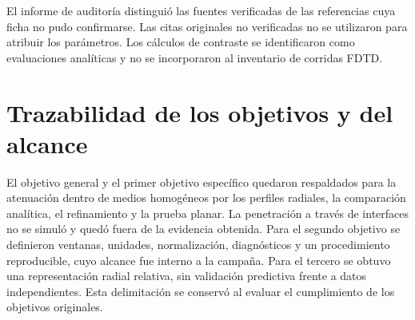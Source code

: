 El informe de auditoría distinguió las fuentes verificadas de las referencias cuya ficha no pudo confirmarse. Las citas originales no verificadas no se utilizaron para atribuir los parámetros. Los cálculos de contraste se identificaron como evaluaciones analíticas y no se incorporaron al inventario de corridas FDTD.

\section{Trazabilidad de los objetivos y del alcance}
El objetivo general y el primer objetivo específico quedaron respaldados para la atenuación dentro de medios homogéneos por los perfiles radiales, la comparación analítica, el refinamiento y la prueba planar. La penetración a través de interfaces no se simuló y quedó fuera de la evidencia obtenida. Para el segundo objetivo se definieron ventanas, unidades, normalización, diagnósticos y un procedimiento reproducible, cuyo alcance fue interno a la campaña. Para el tercero se obtuvo una representación radial relativa, sin validación predictiva frente a datos independientes. Esta delimitación se conservó al evaluar el cumplimiento de los objetivos originales.
